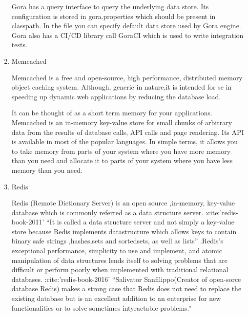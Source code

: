 \begin{enumerate}
\begin{enumerate}
\end{enumerate}

Gora has a query interface to query the underlying data
store. Its configuration is stored in gora.properties which
should be present in classpath. In the file you can specify
default data store used by Gora engine. Gora also has a CI/CD
library call GoraCI which is used to write integration tests.

\item {} 
Memcached

Memcached is a free and open-source, high performance,
distributed memory object caching system. \label{\detokenize{i524/technologies:id339}}{\hyperref[\detokenize{i524/technologies:www-memcached}]{\sphinxcrossref{{[}290{]}}}}
Although, generic in nature,it is intended for se in speeding up
dynamic web applications by reducing the database load.

It can be thought of as a short term memory for your
applications.  Memcached is an in-memory key-value store for
small chunks of arbitrary data from the results of database
calls, API calls and page rendering. Its API is available in most
of the popular languages. In simple terms, it allows you to take
memory from parts of your system where you have more memory than
you need and allocate it to parts of your system where you have
less memory than you need.

\item {} 
Redis

Redis (Remote Dictionary Server) is an open source ,in-memory,
key-value database which is commonly referred as a data structure
server.  :cite:'redis-book-2011' ``It is called a data structure
server and not simply a key-value store because Redis implements
datastructure which allows keys to contain binary safe strings
,hashes,sets and sortedsets, as well as lists'' .Redis’s
exceptional performance, simplicity to use and implement, and
atomic manipulation of data structures lends itself to solving
problems that are difficult or perform poorly when implemented
with traditional relational databases.  :cite:'redis-book-2016'
``Salivator Sanfilippo(Creator of open-sorce database Redis) makes
a strong case that Redis does not need to replace the existing
database but is an excellent addition to an enterprise for new
functionalities or to solve sometimes intyractable problems.''


\end{enumerate}
